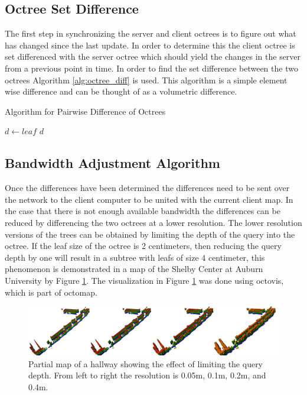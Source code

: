 \documentclass[12pt]{report}
\begin{document}
\subsection{Octree Set Difference}
The first step in synchronizing the server and client octrees is to figure out what has changed since the last update. In order to determine this the client octree is set differenced with the server octree which should yield the changes in the server from a previous point in time. In order to find the set difference between the two octrees Algorithm \ref{alg:octree_diff} is used. This algorithm is a simple element wise difference and can be thought of as a volumetric difference.

\begin{algorithm}
\caption{Algorithm for Pairwise Difference of Octrees}
\label{alg:octree_diff}
\begin{algorithmic}
  \STATE {}
  \STATE {}
  \STATE {}
      \STATE $d\gets leaf$
    \ENDIF
  \ENDFOR
  \RETURN $d$
\end{algorithmic}
\end{algorithm}

\subsection{Bandwidth Adjustment Algorithm}
Once the differences have been determined the differences need to be sent over the network to the client computer to be united with the current client map. In the case that there is not enough available bandwidth the differences can be reduced by differencing the two octrees at a lower resolution. The lower resolution versions of the trees can be obtained by limiting the depth of the query into the octree. If the leaf size of the octree is 2 centimeters, then reducing the query depth by one will result in a subtree with leafs of size 4 centimeter, this phenomenon is demonstrated in a map of the Shelby Center at Auburn University by Figure \ref{fig:treedepth}.  The visualization in Figure \ref{fig:treedepth} was done using octovis\cite{octomap}, which is part of octomap.

\begin{figure}[ht]
  \centering
  \includegraphics[width=6.5in,keepaspectratio]{ShelbySE_2f_combined_octovis.png}
  \caption{Partial map of a hallway showing the effect of limiting the query 
           depth.  From left to right the resolution is 0.05m, 0.1m, 0.2m,
           and 0.4m.}
  \label{fig:treedepth}
\end{figure}
\end{document}
